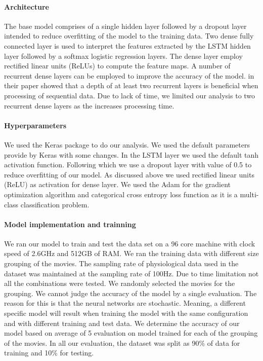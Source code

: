 \paragraph{Architecture} The base model comprises of a single hidden layer followed by a dropout layer intended to reduce overfitting of the model to the training data. Two dense fully connected layer is used to interpret the features extracted by the LSTM hidden layer followed by a softmax logistic regression layers. The dense layer employ rectified linear units (ReLUs) to compute the feature maps. A number of recurrent dense layers can be employed to improve the accuracy of the model. \citeauthor{karpathy_visualizing_2015} in their paper showed that a depth of at least two recurrent layers is beneficial when processing of sequential data. Due to lack of time, we limited our analysis to two recurrent dense layers as the increases processing time. 

\paragraph{Hyperparameters} We used the Keras \cite{keras} package to do our analysis. We used the default parameters provide by Keras with some changes. In the LSTM layer we used the default tanh activation function. Following which we use a dropout layer with value of 0.5 to reduce overfitting of our model. As discussed above we used rectified linear units (ReLU) as activation for dense layer. We used the Adam for the gradient optimization algorithm \cite{kingma_adam:_2014} and categorical cross entropy loss function as it is a multi-class classification problem. 

\paragraph{Model implementation and trainning} We ran our model to train and test the data set on a 96 core machine with clock speed of 2.6GHz and 512GB of RAM. We ran the training data with different size grouping of the movies. The sampling rate of physiological data used in the dataset was maintained at the sampling rate of 100Hz. Due to time limitation not all the combinations were tested. We randomly selected the movies for the grouping. We cannot judge the accuracy of the model by a single evaluation. The reason for this is that the neural networks are stochastic. Meaning, a different specific model will result when training the model with the same configuration and with different training and test data. We determine the accuracy of our model based on average of 5 evaluation on model trained for each of the grouping of the movies. In all our evaluation, the dataset was split as 90\% of data for training and 10\% for testing.

